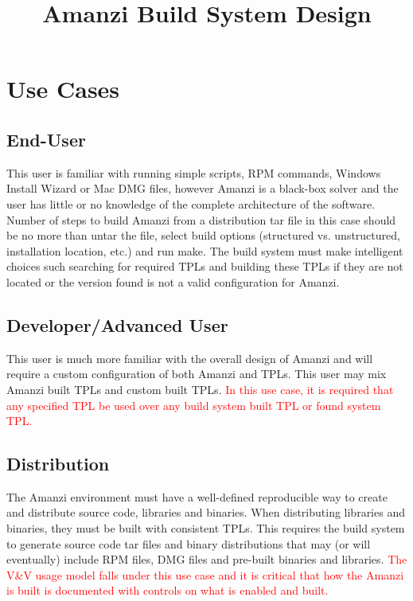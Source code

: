 \documentclass[12pt]{article}
\begin{document}
\title{Amanzi Build System Design}

\section{Use Cases}
\subsection{End-User}
This user is familiar with running simple scripts, RPM commands, Windows Install Wizard or Mac DMG files,
however Amanzi is a black-box solver and the user has little or no knowledge of the complete architecture
of the software.
Number of steps to build Amanzi from a distribution tar file in this case should be no more than untar the file,
select build options (structured vs. unstructured, installation location, etc.) and run make.  The 
build system must make intelligent choices such searching for required TPLs and building these
TPLs if they are not located or the version found is not a valid configuration for Amanzi.

\subsection{Developer/Advanced User}
This user is much more familiar with the overall design of Amanzi and will require a custom configuration
of both Amanzi and TPLs. This user may mix Amanzi built TPLs and custom built TPLs. \textcolor{red}{In this use case, it
is required that any specified TPL be used over any build system built TPL or found system TPL.} 

\subsection{Distribution}
The Amanzi environment must have a well-defined reproducible way to create and distribute source code, libraries
and binaries. When distributing libraries and binaries, they must be built with consistent TPLs. This requires the build
system to generate source code tar files and binary distributions that may (or will eventually) include RPM files,
DMG files and pre-built binaries and libraries. \textcolor{red}{The V\&V usage model falls under this use case and it
is critical that how the Amanzi is built is documented with controls on what is enabled and built.}
\end{document}
